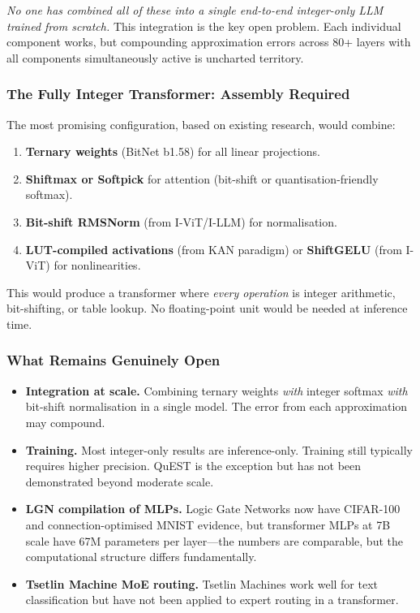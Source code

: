 \emph{No one has combined all of these into a single end-to-end
integer-only LLM trained from scratch.} This integration is the
key open problem. Each individual component works, but compounding
approximation errors across 80+ layers with all components
simultaneously active is uncharted territory.

\subsubsection{The Fully Integer Transformer: Assembly Required}

The most promising configuration, based on existing research, would
combine:

\begin{enumerate}[leftmargin=2em]
  \item \textbf{Ternary weights} (BitNet b1.58) for all linear
    projections.
  \item \textbf{Shiftmax or Softpick} for attention (bit-shift or
    quantisation-friendly softmax).
  \item \textbf{Bit-shift RMSNorm} (from I-ViT/I-LLM) for
    normalisation.
  \item \textbf{LUT-compiled activations} (from KAN paradigm) or
    \textbf{ShiftGELU} (from I-ViT) for nonlinearities.
\end{enumerate}

This would produce a transformer where \emph{every operation} is
integer arithmetic, bit-shifting, or table lookup. No floating-point
unit would be needed at inference time.

\subsubsection{What Remains Genuinely Open}

\begin{itemize}[leftmargin=2em]
  \item \textbf{Integration at scale.} Combining ternary weights
    \emph{with} integer softmax \emph{with} bit-shift normalisation
    in a single model. The error from each approximation may compound.
  \item \textbf{Training.} Most integer-only results are
    inference-only. Training still typically requires higher
    precision. QuEST is the exception but has not been demonstrated
    beyond moderate scale.
  \item \textbf{LGN compilation of MLPs.} Logic Gate Networks now have
    CIFAR-100 and connection-optimised MNIST evidence, but transformer
    MLPs at
    7B scale have 67M parameters per layer---the numbers are
    comparable, but the computational structure differs fundamentally.
  \item \textbf{Tsetlin Machine MoE routing.} Tsetlin Machines
    work well for text classification but have not been applied to
    expert routing in a transformer.
\end{itemize}

